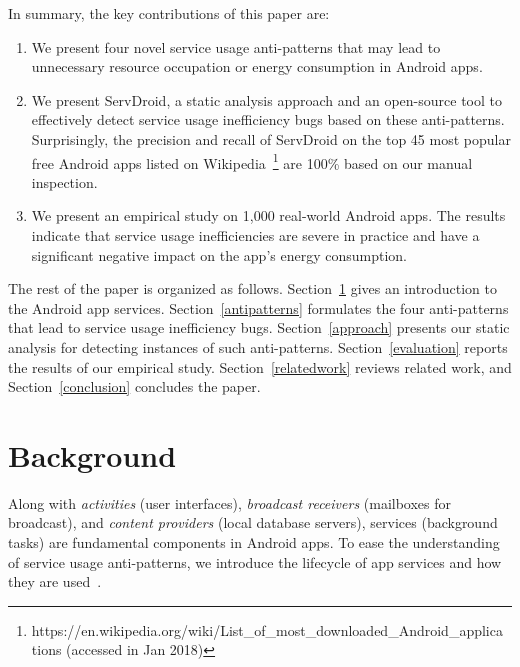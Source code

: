 \documentclass[sigconf,review, anonymous]{acmart}
\begin{document}
In summary, the key contributions of this paper are:
\begin{enumerate}
\item We present four novel service usage
anti-patterns that may lead to unnecessary resource occupation or energy
consumption in Android apps.
\item We present \textsf{ServDroid}, a static analysis approach and an
open-source tool to effectively detect service usage
inefficiency bugs based on these anti-patterns. Surprisingly, the precision and
recall of \textsf{ServDroid} on the top 45 most popular free Android apps listed on
Wikipedia~\footnote{https://en.wikipedia.org/wiki/List\_of\_most\_downloaded\_Android\_applica\\tions
(accessed in Jan 2018)} are 100\% based on our manual inspection.
\item We present an empirical study on 1,000 real-world Android apps. The
results indicate that service usage inefficiencies are severe
in practice and have a significant negative impact on the app's energy
consumption.
\end{enumerate}


The rest of the paper is organized as follows. Section~\ref{background} gives an
introduction to the Android app services.
Section~\ref{antipatterns} formulates the four anti-patterns that lead to
service usage inefficiency bugs.
Section~\ref{approach} presents our static analysis for detecting instances
of such anti-patterns.
Section~\ref{evaluation} reports the results of our empirical study.
Section~\ref{relatedwork} reviews related work, and
Section~\ref{conclusion} concludes the paper.

\section{Background}\label{background}
Along with \textit{activities} (user interfaces),
\textit{broadcast receivers} (mailboxes for broadcast), and \textit{content providers} (local database servers), services (background tasks) are fundamental components in Android apps. To ease the understanding of service usage anti-patterns, we introduce the lifecycle of app services and how they are used~\cite{Androidservice}.
\end{document}
